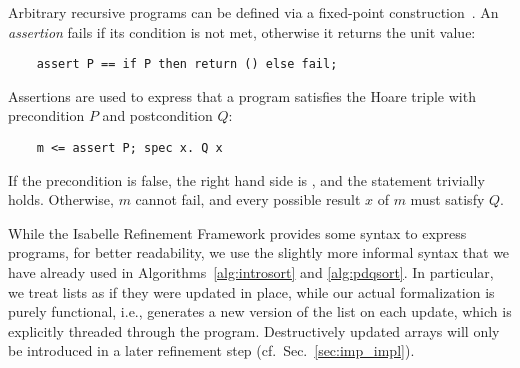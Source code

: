 \documentclass[runningheads]{llncs}
\begin{document}

  Arbitrary recursive programs can be defined via a fixed-point construction~\cite{Kr10}.
  An \emph{assertion} fails if its condition is not met, otherwise it returns the unit value:
  \begin{lstlisting}
    assert P == if P then return () else fail;
  \end{lstlisting}
  Assertions are used to express that a program  satisfies the Hoare triple with
  precondition \is$P$ and postcondition \is$Q$:
  \begin{lstlisting}
    m <= assert P; spec x. Q x
  \end{lstlisting}
  If the precondition is false, the right hand side is , and the statement trivially holds.
  Otherwise, $m$ cannot fail, and every possible result $x$ of $m$ must satisfy $Q$.

  While the Isabelle Refinement Framework provides some syntax to express programs, for better
  readability, we use the slightly more informal syntax that we have already used in Algorithms~\ref{alg:introsort} and \ref{alg:pdqsort}.
  In particular, we treat lists as if they were updated in place, while our actual formalization is purely functional, i.e., generates a new
  version of the list on each update, which is explicitly threaded through the program. Destructively updated arrays will only be introduced in a
  later refinement step (cf.~Sec.~\ref{sec:imp_impl}).
\end{document}
